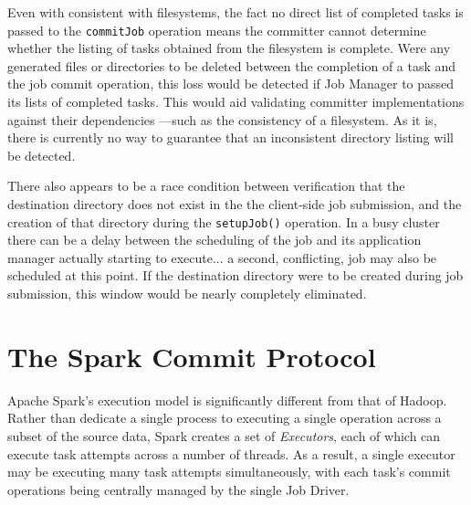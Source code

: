\documentclass[conference]{IEEEtran}
\begin{document}
Even with consistent with filesystems, the fact no direct list
of completed tasks is passed to the \texttt{commitJob} operation means
the committer cannot determine whether the listing of tasks obtained
from the filesystem is complete.
Were any generated files or directories to be deleted between the completion
of a task and the job commit operation, this loss would be detected
if Job Manager to passed its lists of completed tasks.
This would aid validating committer implementations against their dependencies
---such as the consistency of a filesystem.
As it is, there is currently no way to guarantee that an inconsistent directory
listing will be detected.

There also appears to be a race condition between
verification that the destination directory does not exist in the
the client-side job submission, and the creation of that directory during
the \texttt{setupJob()} operation.
In a busy cluster there can be a delay between the scheduling of the job and
its application manager actually starting to execute...
a second, conflicting, job may also be scheduled at this point.
If the destination directory were to be created during job submission,
this window would be nearly completely eliminated.


\section{The Spark Commit Protocol}
\label{sec:theSparkCommitProtocol}

Apache Spark's execution model is significantly different from
that of Hadoop.
Rather than dedicate a single process to executing a single operation
across a subset of the source data, Spark creates a set of \emph{Executors},
each of which can execute task attempts across a number of threads.
As a result, a single executor may be executing many task attempts
simultaneously, with each task's commit operations being centrally managed
by the single Job Driver.
\end{document}
